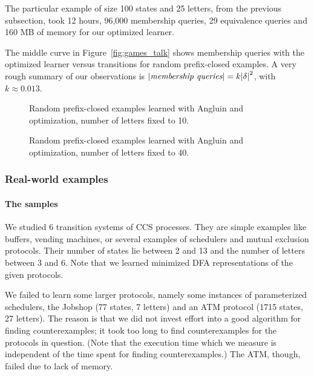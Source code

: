 The particular example of size 100 states and 25 letters, from the
previous subsection, took 12 hours, 96,000 membership queries, 29
equivalence queries and 160 MB of memory for our optimized learner.

The middle curve in Figure~\ref{fig:games_talk} shows
membership queries with the optimized learner versus transitions for
random prefix-closed examples. A very rough summary of our
observations is $|\textit{membership queries}| = k {|\delta|}^2$, with $k \approx 0.013$.

\begin{figure}
  \begin{center}
    \caption{Random prefix-closed examples learned with Angluin and optimization, number of letters fixed to 10.\label{fig:pic_randomPrefixClosed}}
  \end{center}
\end{figure}


\begin{figure}
  \begin{center}
    \caption{Random prefix-closed examples learned with Angluin and
    optimization, number of letters fixed to 40.\label{fig:pic_randomPrefixClosed_big}}
  \end{center}
\end{figure}

\subsubsection{Real-world examples}

\paragraph{The samples} We studied 6 transition systems of CCS
processes. They are simple examples like buffers, vending machines, or
several examples of schedulers and mutual exclusion protocols. Their
number of states lie between 2 and 13 and the number of letters
between 3 and 6. Note that we learned minimized DFA representations of
the given protocols.

We failed to learn some larger protocols, namely some instances of
parameterized schedulers, the Jobshop (77 states, 7 letters) and an
ATM protocol (1715 states, 27 letters). The reason is that we did not
invest effort into a good algorithm for finding counterexamples; it
took too long to find counterexamples for the protocols in question.
(Note that the execution time which we measure is independent of the
time spent for finding counterexamples.) The ATM, though, failed due
to lack of memory.

